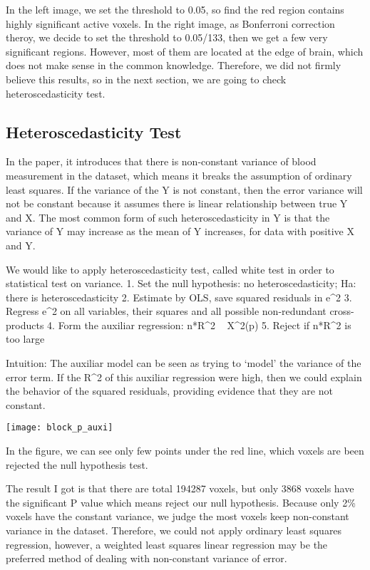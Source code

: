 In the left image, we set the threshold to 0.05, so find the red region contains
highly significant active voxels. In the right image, as Bonferroni correction
theroy, we decide to set the threshold to 0.05/133, then we get a few very 
significant regions. However, most of them are located at the edge of brain, 
which does not make sense in the common knowledge. Therefore, we did not firmly
believe this results, so in the next section, we are going to check heteroscedasticity
test.

\subsection{Heteroscedasticity Test}
In the paper, it introduces that there is non-constant variance of blood 
measurement in the dataset, which means it breaks the assumption of ordinary 
least squares. If the variance of the Y is not constant, then the error variance
will not be constant because it assumes there is linear relationship between 
true Y and X. The most common form of such heteroscedasticity in Y is that the 
variance of Y may increase as the mean of Y increases, for data with positive X
and Y.

We would like to apply heteroscedasticity test, called white test in order to 
statistical test on variance.
1. Set the null hypothesis: no heteroscedasticity; Ha: there is heteroscedasticity
2. Estimate by OLS, save squared residuals in e^2
3. Regress e^2 on all variables, their squares and all possible non-redundant cross-products
4. Form the auxiliar regression: n*R^2 ~ X^2(p)
5. Reject if n*R^2 is too large

Intuition: The auxiliar model can be seen as trying to ‘model’ the variance of 
the error term. If the R^2 of this auxiliar regression were high, then we could
explain the behavior of the squared residuals, providing evidence that they are
not constant.

\texttt{[image: block\_p\_auxi]}
\label{P value for heteroscedasticity test in block design}

In the figure, we can see only few points under the red line, which voxels are
been rejected the null hypothesis test. 

The result I got is that there are total 194287 voxels, but only 3868 voxels 
have the significant P value which means reject our null hypothesis. Because 
only 2\% voxels have the constant variance, we judge the most voxels keep 
non-constant variance in the dataset. Therefore, we could not apply ordinary 
least squares regression, however, a weighted least squares linear regression 
may be the preferred method of dealing with non-constant variance of error.

